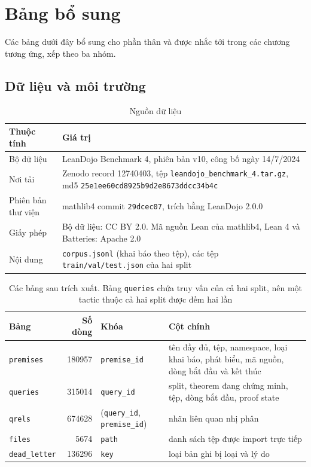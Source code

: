 \documentclass[11pt,a4paper,oneside]{report}
\newcommand{\code}[1]{\texttt{#1}}
\begin{document}
\chapter{Bảng bổ sung}\label{app:tables}

Các bảng dưới đây bổ sung cho phần thân và được nhắc tới trong các chương tương ứng, xếp theo ba nhóm.

\section{Dữ liệu và môi trường}

\begin{table}[htbp]
\centering
\caption{Nguồn dữ liệu}\label{tab:source}
\begin{tabularx}{\linewidth}{@{}lX@{}}
\toprule
Thuộc tính & Giá trị \\
\midrule
Bộ dữ liệu & LeanDojo Benchmark 4, phiên bản v10, công bố ngày 14/7/2024 \\
Nơi tải & Zenodo record 12740403, tệp \code{leandojo\_benchmark\_4.tar.gz}, md5 \code{25e1ee60cd8925b9d2e8673ddcc34b4c} \\
Phiên bản thư viện & mathlib4 commit \code{29dcec07}, trích bằng LeanDojo 2.0.0~\cite{mathlib4repo} \\
Giấy phép & Bộ dữ liệu: CC BY 2.0. Mã nguồn Lean của mathlib4, Lean 4 và Batteries: Apache 2.0 \\
Nội dung & \code{corpus.jsonl} (khai báo theo tệp), các tệp \code{train/val/test.json} của hai split \\
\bottomrule
\end{tabularx}
\end{table}

\begin{table}[htbp]
\centering
\caption[Các bảng sau trích xuất]{Các bảng sau trích xuất. Bảng \code{queries} chứa truy vấn của cả hai split, nên
một tactic thuộc cả hai split được đếm hai lần}\label{tab:schema}
\begin{tabularx}{\linewidth}{@{}lr>{\raggedright\arraybackslash}p{2.6cm}X@{}}
\toprule
Bảng & Số dòng & Khóa & Cột chính \\
\midrule
\code{premises} & \num{180957} & \code{premise\_id} & tên đầy đủ, tệp, namespace, loại khai báo, phát biểu, mã nguồn, dòng bắt đầu và kết thúc \\
\code{queries} & \num{315014} & \code{query\_id} & split, theorem đang chứng minh, tệp, dòng bắt đầu, proof state \\
\code{qrels} & \num{674628} & (\code{query\_id}, \code{premise\_id}) & nhãn liên quan nhị phân \\
\code{files} & \num{5674} & \code{path} & danh sách tệp được import trực tiếp \\
\code{dead\_letter} & \num{136296} & \code{key} & loại bản ghi bị loại và lý do \\
\bottomrule
\end{tabularx}
\end{table}
\end{document}

